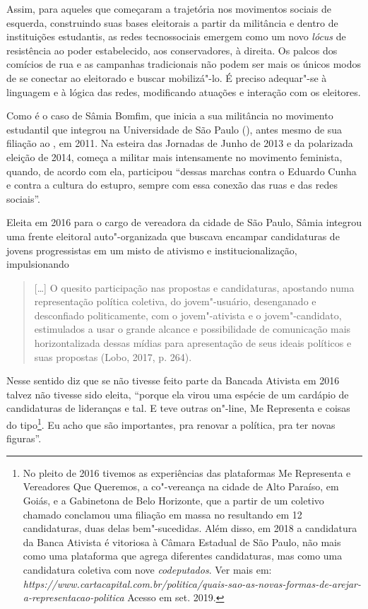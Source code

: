 Assim, para aqueles que começaram a trajetória nos movimentos sociais de
esquerda, construindo suas bases eleitorais a partir da militância e
dentro de instituições estudantis, as redes tecnossociais emergem como
um novo \emph{lócus} de resistência ao poder estabelecido, aos
conservadores, à direita. Os palcos dos comícios de rua e as campanhas
tradicionais não podem ser mais os únicos modos de se conectar ao
eleitorado e buscar mobilizá"-lo. É preciso adequar"-se à linguagem e à
lógica das redes, modificando atuações e interação com os eleitores.

Como é o caso de Sâmia Bomfim, que inicia a sua militância no movimento
estudantil que integrou na Universidade de São Paulo (), antes mesmo
de sua filiação ao , em 2011. Na esteira das Jornadas de Junho de
2013 e da polarizada eleição de 2014, começa a militar mais intensamente
no movimento feminista, quando, de acordo com ela, participou ``dessas
marchas contra o Eduardo Cunha e contra a cultura do estupro, sempre com
essa conexão das ruas e das redes sociais''.

Eleita em 2016 para o cargo de vereadora da cidade de São Paulo, Sâmia
integrou uma frente eleitoral auto"-organizada que buscava encampar
candidaturas de jovens progressistas em um misto de ativismo e
institucionalização, impulsionando

\begin{quote}
{[}\ldots{}{]} O quesito participação nas propostas e candidaturas, apostando
numa representação política coletiva, do jovem"-usuário, desenganado e
desconfiado politicamente, com o jovem"-ativista e o jovem"-candidato,
estimulados a usar o grande alcance e possibilidade de comunicação mais
horizontalizada dessas mídias para apresentação de seus ideais políticos
e suas propostas (Lobo, 2017, p. 264).
\end{quote}

Nesse sentido diz que se não tivesse feito parte da Bancada Ativista em
2016 talvez não tivesse sido eleita, ``porque ela virou uma espécie de
um cardápio de candidaturas de lideranças e tal. E teve outras on"-line,
Me Representa e coisas do tipo\footnote{No pleito de 2016 tivemos as
  experiências das plataformas Me Representa e Vereadores Que Queremos,
  a co"-vereança na cidade de Alto Paraíso, em Goiás, e a Gabinetona de
  Belo Horizonte, que a partir de um coletivo chamado  conclamou
  uma filiação em massa no  resultando em 12 candidaturas, duas
  delas bem"-sucedidas. Além disso, em 2018 a candidatura da Banca
  Ativista é vitoriosa à Câmara Estadual de São Paulo, não mais como uma
  plataforma que agrega diferentes candidaturas, mas como uma
  candidatura coletiva com nove \emph{codeputados}. Ver mais em:
  \emph{https://www.cartacapital.com.br/politica/quais-sao-as-novas-formas-de-arejar-a-representacao-politica}
  Acesso em set. 2019.}. Eu acho que são importantes, pra renovar a
política, pra ter novas figuras''.


